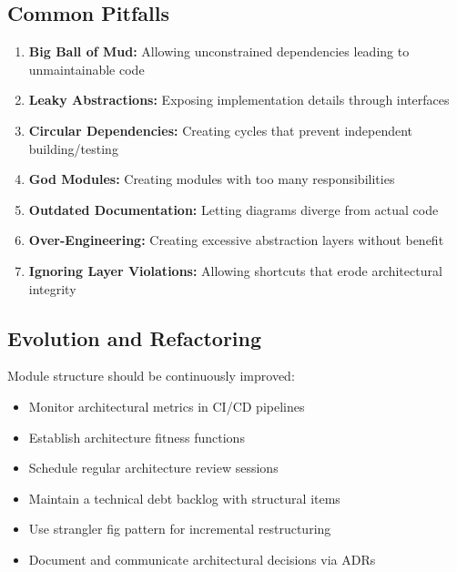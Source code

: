 \documentclass[11pt,letterpaper]{article}
\begin{document}
\subsection{Common Pitfalls}

\begin{warningbox}
\begin{enumerate}[nosep]
    \item \textbf{Big Ball of Mud:} Allowing unconstrained dependencies leading to unmaintainable code
    \item \textbf{Leaky Abstractions:} Exposing implementation details through interfaces
    \item \textbf{Circular Dependencies:} Creating cycles that prevent independent building/testing
    \item \textbf{God Modules:} Creating modules with too many responsibilities
    \item \textbf{Outdated Documentation:} Letting diagrams diverge from actual code
    \item \textbf{Over-Engineering:} Creating excessive abstraction layers without benefit
    \item \textbf{Ignoring Layer Violations:} Allowing shortcuts that erode architectural integrity
\end{enumerate}
\end{warningbox}

\subsection{Evolution and Refactoring}

Module structure should be continuously improved:

\begin{itemize}
    \item Monitor architectural metrics in CI/CD pipelines
    \item Establish architecture fitness functions
    \item Schedule regular architecture review sessions
    \item Maintain a technical debt backlog with structural items
    \item Use strangler fig pattern for incremental restructuring
    \item Document and communicate architectural decisions via ADRs
\end{itemize}

\end{document}
